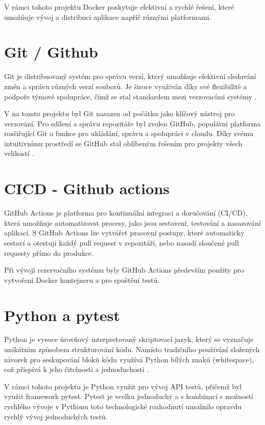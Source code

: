 V rámci tohoto projektu Docker poskytuje efektivní a rychlé řešení, které umožňuje vývoj a distribuci aplikace napříč různými platformami.

\section{Git / Github}
Git je distribuovaný systém pro správu verzí, který umožňuje efektivní sledování změn a správu různých verzí souborů. Je široce využíván díky své flexibilitě a podpoře týmové spolupráce, čímž se stal standardem mezi verzovacími systémy \cite{spinellis2012git}.

V na tomto projektu byl Git nasazen od počátku jako klíčový nástroj pro verzování. Pro sdílení a správu repozitáře byl zvolen GitHub, populární platforma rozšiřující Git o funkce pro ukládání, správu a spolupráci v cloudu. Díky svému intuitivnímu prostředí se GitHub stal oblíbeným řešením pro projekty všech velikostí \cite{githubAboutGitHub}.

\section{CICD - Github actions}
GitHub Actions je platforma pro kontinuální integraci a doručování (CI/CD), která umožňuje automatizovat procesy, jako jsou sestavení, testování a nasazování aplikací. S GitHub Actions lze vytvářet pracovní postupy, které automaticky sestaví a otestují každý pull request v repozitáři, nebo nasadí sloučené pull requesty přímo do produkce\cite{githubinc_2024_understanding}.

Při vývoji rezervačního systému byly GitHub Actions především použity pro vytvoření Docker kontejneru a pro spuštění testů.

\section{Python a pytest}
Python je vysoce úrovňový interpretovaný skriptovací jazyk, který se vyznačuje unikátním způsobem strukturování kódu. Namísto tradičního používání složených závorek pro seskupování bloků kódu využívá Python bílých znaků (whitespace), což přispívá k jeho čitelnosti a jednoduchosti \cite{kuhlman2009python, van1990functional}.

V rámci tohoto projektu je Python využit pro vývoj API testů, přičemž byl využit framework pytest. Pytest je vcelku jednoduchý a s kombinací s možností rychlého vývoje v Pythonu toto technologické rozhodnutí umožnilo opravdu rychlý vývoj jednoduchých testů.

